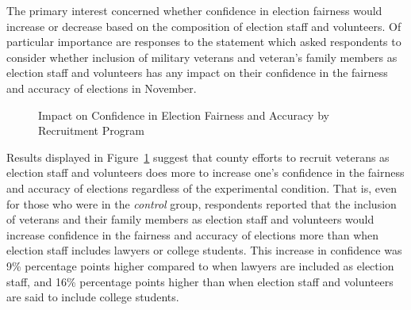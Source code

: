 \documentclass[
  11pt,
  a4paper,
]{article}
\begin{document}
The primary interest concerned whether confidence in election fairness
would increase or decrease based on the composition of election staff
and volunteers. Of particular importance are responses to the statement
which asked respondents to consider whether inclusion of military
veterans and veteran's family members as election staff and volunteers
has any impact on their confidence in the fairness and accuracy of
elections in November.

\begin{figure}


\caption{\label{fig-q41-likert}Impact on Confidence in Election Fairness
and Accuracy by Recruitment Program}

\end{figure}%

Results displayed in Figure~\ref{fig-q41-likert} suggest that county
efforts to recruit veterans as election staff and volunteers does more
to increase one's confidence in the fairness and accuracy of elections
regardless of the experimental condition. That is, even for those who
were in the \emph{control} group, respondents reported that the
inclusion of veterans and their family members as election staff and
volunteers would increase confidence in the fairness and accuracy of
elections more than when election staff includes lawyers or college
students. This increase in confidence was 9\% percentage points higher
compared to when lawyers are included as election staff, and 16\%
percentage points higher than when election staff and volunteers are
said to include college students.
\end{document}
